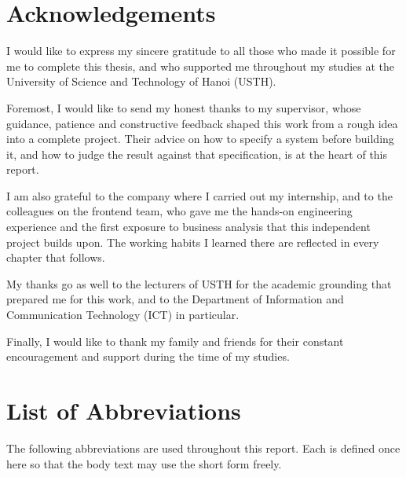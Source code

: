 \documentclass[12pt,a4paper]{report}
\begin{document}
\chapter*{Acknowledgements}

I would like to express my sincere gratitude to all those who made it possible
for me to complete this thesis, and who supported me throughout my studies at
the University of Science and Technology of Hanoi (USTH).

Foremost, I would like to send my honest thanks to my supervisor, whose
guidance, patience and constructive feedback shaped this work from a rough idea
into a complete project. Their advice on how to specify a system before building
it, and how to judge the result against that specification, is at the heart of
this report.

I am also grateful to the company where I carried out my internship, and to the
colleagues on the frontend team, who gave me the hands-on engineering experience
and the first exposure to business analysis that this independent project builds
upon. The working habits I learned there are reflected in every chapter that
follows.

My thanks go as well to the lecturers of USTH for the academic grounding that
prepared me for this work, and to the Department of Information and Communication
Technology (ICT) in particular.

Finally, I would like to thank my family and friends for their constant
encouragement and support during the time of my studies.

\chapter*{List of Abbreviations}

The following abbreviations are used throughout this report. Each is defined
once here so that the body text may use the short form freely.
\end{document}
